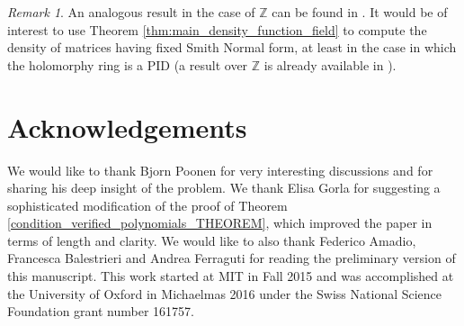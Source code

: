\documentclass[10pt]{amsart}
\theoremstyle{definition}
\theoremstyle{remark}
\newtheorem{remark}[theorem]{Remark}
\numberwithin{equation}{section}
\begin{document}
\begin{remark}
An analogous result in the case of $\mathbb Z$ can be found in \cite{bib:maze2011natural}. It would be of interest to use Theorem \ref{thm:main_density_function_field} to compute the density of matrices having fixed Smith Normal form, at least in the case in which the holomorphy ring is a PID  (a result over $\mathbb Z$ is already available in \cite{wang2015smith}).
\end{remark}


\section*{Acknowledgements}
We would like to thank Bjorn Poonen for very interesting discussions and for sharing his deep insight of the problem. 
We thank Elisa Gorla for suggesting a sophisticated modification of the proof of Theorem \ref{condition_verified_polynomials_THEOREM}, which improved the paper in terms of length and clarity.
We would like to also thank Federico Amadio, Francesca Balestrieri and Andrea Ferraguti for reading the preliminary version of this manuscript.
This work started at MIT in Fall 2015 and was accomplished at the University of Oxford in Michaelmas 2016 under the Swiss National Science Foundation grant number 161757. 


{}
\end{document}
